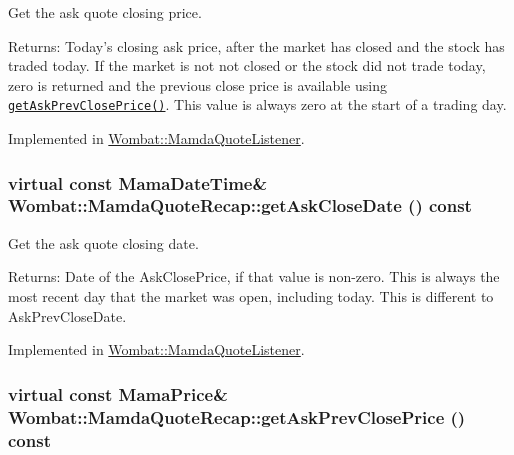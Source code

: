 Get the ask quote closing price. 

\begin{Desc}
\item[Returns:]Today's closing ask price, after the market has closed and the stock has traded today. If the market is not not closed or the stock did not trade today, zero is returned and the previous close price is available using {\tt \hyperlink{classWombat_1_1MamdaQuoteRecap_521a7513135af4b11b964473ce74bc88}{get\-Ask\-Prev\-Close\-Price()}}. This value is always zero at the start of a trading day. \end{Desc}


Implemented in \hyperlink{classWombat_1_1MamdaQuoteListener_1c6e2936fa8677578ee30e6a50ee29bf}{Wombat::Mamda\-Quote\-Listener}.\hypertarget{classWombat_1_1MamdaQuoteRecap_4f95ffdb921180d5a7a5d6f488b6014c}{
\subsubsection[getAskCloseDate]{\setlength{\rightskip}{0pt plus 5cm}virtual const Mama\-Date\-Time\& Wombat::Mamda\-Quote\-Recap::get\-Ask\-Close\-Date () const}}
\label{classWombat_1_1MamdaQuoteRecap_4f95ffdb921180d5a7a5d6f488b6014c}


Get the ask quote closing date. 

\begin{Desc}
\item[Returns:]Date of the Ask\-Close\-Price, if that value is non-zero. This is always the most recent day that the market was open, including today. This is different to Ask\-Prev\-Close\-Date. \end{Desc}


Implemented in \hyperlink{classWombat_1_1MamdaQuoteListener_3454bc5865c264f87778000ed9348f91}{Wombat::Mamda\-Quote\-Listener}.\hypertarget{classWombat_1_1MamdaQuoteRecap_521a7513135af4b11b964473ce74bc88}{
\subsubsection[getAskPrevClosePrice]{\setlength{\rightskip}{0pt plus 5cm}virtual const Mama\-Price\& Wombat::Mamda\-Quote\-Recap::get\-Ask\-Prev\-Close\-Price () const}}
\label{classWombat_1_1MamdaQuoteRecap_521a7513135af4b11b964473ce74bc88}


